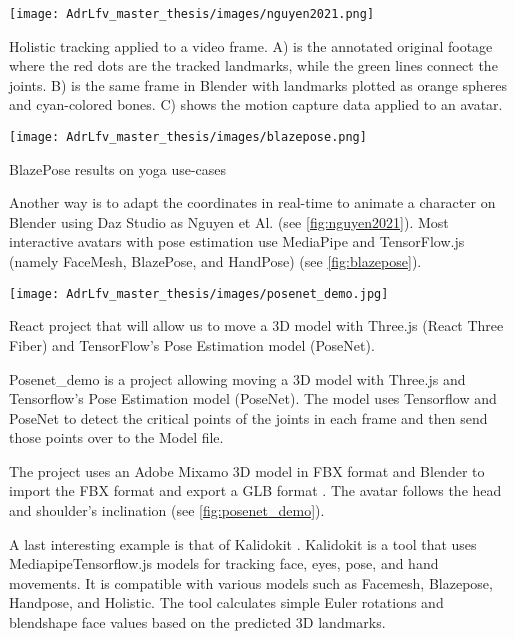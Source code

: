 \begin{marginfigure}
    \centering
    \texttt{[image: AdrLfv\_master\_thesis/images/nguyen2021.png]}
    \caption{Holistic tracking applied to a video frame. A) is the annotated original footage where
    the red dots are the tracked landmarks, while the green lines connect the joints. B) is the same
    frame in Blender with landmarks plotted as orange spheres and cyan-colored bones. C) shows the motion capture data applied to an avatar. \cite{nguyen2021automatic}}
    \label{fig:nguyen2021}
\end{marginfigure}

\begin{marginfigure}
    \centering
    \texttt{[image: AdrLfv\_master\_thesis/images/blazepose.png]}
    \caption{BlazePose results on yoga use-cases}
    \label{fig:blazepose}
\end{marginfigure}

Another way is to adapt the coordinates in real-time to animate a character on Blender using Daz Studio as Nguyen et Al. \cite{nguyen2021automatic} (see \ref{fig:nguyen2021}). Most interactive avatars with pose estimation use MediaPipe and TensorFlow.js (namely FaceMesh, BlazePose, and HandPose) \cite{blazepose} (see \ref{fig:blazepose}).

\begin{marginfigure}
    \centering
    \texttt{[image: AdrLfv\_master\_thesis/images/posenet\_demo.jpg]}
    \caption{React project that will allow us to move a 3D model with Three.js (React Three Fiber) and TensorFlow's Pose Estimation model (PoseNet).}
    \label{fig:posenet_demo}
\end{marginfigure}

Posenet\_demo \cite{posenet_demo} is a project allowing moving a 3D model with Three.js and Tensorflow's Pose Estimation model (PoseNet). The model uses Tensorflow and PoseNet to detect the critical points of the joints in each frame and then send those points over to the Model file. 

The project uses an Adobe Mixamo \cite{mixamo} 3D model in FBX format and Blender to import the FBX format and export a GLB format \cite{posenet}. The avatar follows the head and shoulder's inclination (see \ref{fig:posenet_demo}).

A last interesting example is that of Kalidokit \cite{kalidokit}. Kalidokit is a tool that uses Mediapipe\/Tensorflow.js models for tracking face, eyes, pose, and hand movements.
It is compatible with various models such as Facemesh, Blazepose, Handpose, and Holistic. The tool calculates simple Euler rotations and blendshape face values based on the predicted 3D landmarks.

